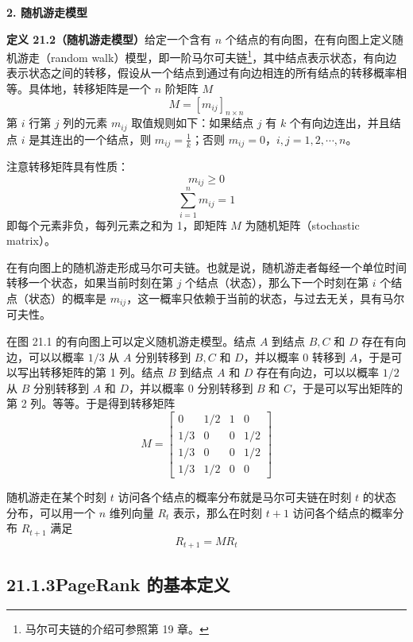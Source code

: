 \documentclass[UTF8, 12pt, fontset=fandol, oneside]{ctexart}
\begin{document}
\noindent\textbf{2. 随机游走模型}

\noindent\textbf{定义 21.2（随机游走模型）}\quad 给定一个含有 $n$ 个结点的有向图，在有向图上定义随机游走（random walk）模型，即一阶马尔可夫链\footnote{马尔可夫链的介绍可参照第 19 章。}，其中结点表示状态，有向边表示状态之间的转移，假设从一个结点到通过有向边相连的所有结点的转移概率相等。具体地，转移矩阵是一个 $n$ 阶矩阵 $M$
\begin{equation}
M=[m_{ij}]_{n\times n}
\tag{21.1}
\end{equation}
第 $i$ 行第 $j$ 列的元素 $m_{ij}$ 取值规则如下：如果结点 $j$ 有 $k$ 个有向边连出，并且结点 $i$ 是其连出的一个结点，则 $m_{ij}=\frac{1}{k}$；否则 $m_{ij}=0$，$i,j=1,2,\cdots,n$。

注意转移矩阵具有性质：
\begin{equation}
m_{ij}\geqslant 0
\tag{21.2}
\end{equation}
\begin{equation}
\sum_{i=1}^n m_{ij}=1
\tag{21.3}
\end{equation}
即每个元素非负，每列元素之和为 1，即矩阵 $M$ 为随机矩阵（stochastic matrix）。

在有向图上的随机游走形成马尔可夫链。也就是说，随机游走者每经一个单位时间转移一个状态，如果当前时刻在第 $j$ 个结点（状态），那么下一个时刻在第 $i$ 个结点（状态）的概率是 $m_{ij}$，这一概率只依赖于当前的状态，与过去无关，具有马尔可夫性。

在图 21.1 的有向图上可以定义随机游走模型。结点 $A$ 到结点 $B,C$ 和 $D$ 存在有向边，可以以概率 $1/3$ 从 $A$ 分别转移到 $B,C$ 和 $D$，并以概率 0 转移到 $A$，于是可以写出转移矩阵的第 1 列。结点 $B$ 到结点 $A$ 和 $D$ 存在有向边，可以以概率 $1/2$ 从 $B$ 分别转移到 $A$ 和 $D$，并以概率 0 分别转移到 $B$ 和 $C$，于是可以写出矩阵的第 2 列。等等。于是得到转移矩阵
\[
M=
\begin{bmatrix}
0 & 1/2 & 1 & 0\\
1/3 & 0 & 0 & 1/2\\
1/3 & 0 & 0 & 1/2\\
1/3 & 1/2 & 0 & 0
\end{bmatrix}
\]

随机游走在某个时刻 $t$ 访问各个结点的概率分布就是马尔可夫链在时刻 $t$ 的状态分布，可以用一个 $n$ 维列向量 $R_t$ 表示，那么在时刻 $t+1$ 访问各个结点的概率分布 $R_{t+1}$ 满足
\begin{equation}
R_{t+1}=MR_t
\tag{21.4}
\end{equation}

\subsection*{21.1.3\quad PageRank 的基本定义}
\end{document}
